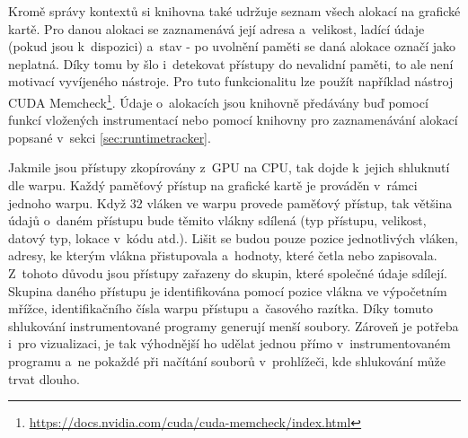 Kromě správy kontextů si knihovna také udržuje seznam všech alokací na grafické kartě. Pro danou alokaci se zaznamenává její adresa a~velikost, ladící údaje (pokud jsou k~dispozici) a~stav - po uvolnění paměti se daná alokace označí jako neplatná. Díky tomu by šlo i~detekovat přístupy do nevalidní paměti, to ale není motivací vyvíjeného nástroje. Pro tuto funkcionalitu lze použít například nástroj CUDA Memcheck\footnote{\url{https://docs.nvidia.com/cuda/cuda-memcheck/index.html}}. Údaje o~alokacích jsou knihovně předávány buď pomocí funkcí vložených instrumentací nebo pomocí knihovny pro zaznamenávání alokací popsané v~sekci \ref{sec:runtimetracker}.

Jakmile jsou přístupy zkopírovány z~GPU na CPU, tak dojde k~jejich shluknutí dle warpu. Každý paměťový přístup na grafické kartě je prováděn v~rámci jednoho warpu. Když 32 vláken ve warpu provede paměťový přístup, tak většina údajů o~daném přístupu bude těmito vlákny sdílená (typ přístupu, velikost, datový typ, lokace v~kódu atd.). Lišit se budou pouze pozice jednotlivých vláken, adresy, ke kterým vlákna přistupovala a~hodnoty, které četla nebo zapisovala. Z~tohoto důvodu jsou přístupy zařazeny do skupin, které společné údaje sdílejí. Skupina daného přístupu je identifikována pomocí pozice vlákna ve výpočetním mřížce, identifikačního čísla warpu přístupu a~časového razítka. Díky tomuto shlukování instrumentované programy generují menší soubory. Zároveň je potřeba i~pro vizualizaci, je tak výhodnější ho udělat \mbox{jednou} přímo v~instrumentovaném programu a~ne pokaždé při načítání souborů v~prohlížeči, kde shlukování může trvat dlouho.

